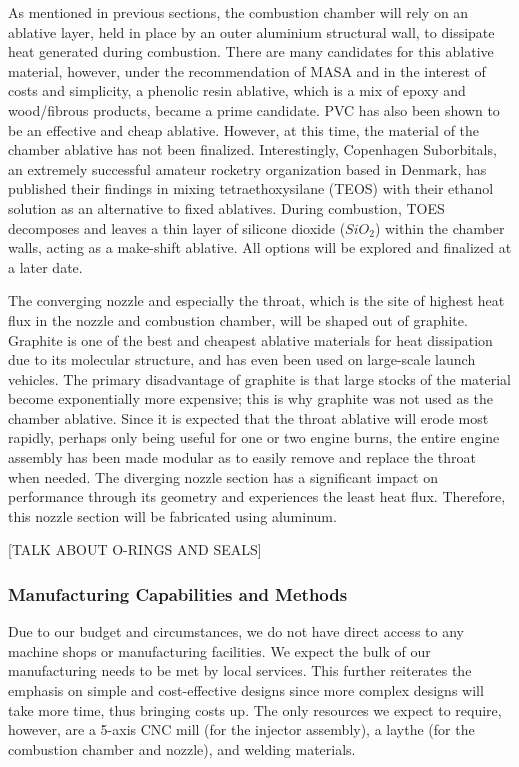\documentclass[9pt]{article} %
\numberwithin{equation}{section} %
\begin{document}
As mentioned in previous sections, the combustion chamber will rely on an ablative layer, held in place by an outer aluminium structural wall, to dissipate heat generated during combustion. There are many candidates for this ablative material, however, under the recommendation of MASA and in the interest of costs and simplicity, a phenolic resin ablative, which is a mix of epoxy and wood/fibrous products, became a prime candidate. PVC has also been shown to be an effective and cheap ablative. However, at this time, the material of the chamber ablative has not been finalized. Interestingly, Copenhagen Suborbitals, an extremely successful amateur rocketry organization based in Denmark, has published their findings in mixing tetraethoxysilane (TEOS) with their ethanol solution as an alternative to fixed ablatives. During combustion, TOES decomposes and leaves a thin layer of silicone dioxide ($SiO_{2}$) within the chamber walls, acting as a make-shift ablative. All options will be explored and finalized at a later date.

The converging nozzle and especially the throat, which is the site of highest heat flux in the nozzle and combustion chamber, will be shaped out of graphite. Graphite is one of the best and cheapest ablative materials for heat dissipation due to its molecular structure, and has even been used on large-scale launch vehicles. The primary disadvantage of graphite is that large stocks of the material become exponentially more expensive; this is why graphite was not used as the chamber ablative. Since it is expected that the throat ablative will erode most rapidly, perhaps only being useful for one or two engine burns, the entire engine assembly has been made modular as to easily remove and replace the throat when needed. The diverging nozzle section has a significant impact on performance through its geometry and experiences the least heat flux. Therefore, this nozzle section will be fabricated using aluminum.

[TALK ABOUT O-RINGS AND SEALS]

\subsubsection{Manufacturing Capabilities and Methods}

\hspace{\parindent} Due to our budget and circumstances, we do not have direct access to any machine shops or manufacturing facilities. We expect the bulk of our manufacturing needs to be met by local services. This further reiterates the emphasis on simple and cost-effective designs since more complex designs will take more time, thus bringing costs up. The only resources we expect to require, however, are a 5-axis CNC mill (for the injector assembly), a laythe (for the combustion chamber and nozzle), and welding materials.
\end{document}
